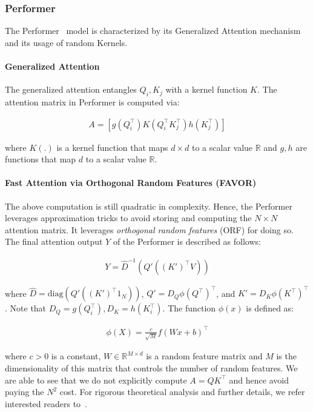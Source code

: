 \subsubsection{Performer}
The Performer~\citep{choromanski2020masked, choromanski2020rethinking} model is characterized by its Generalized Attention mechanism and its usage of random Kernels. 
\paragraph{Generalized Attention}  The generalized attention entangles $Q_i,K_j$ with a kernel function $K$. The attention matrix in Performer is computed via:

\begin{align}
A = [g(Q_i^\top)K(Q_i^\top K_j^\top) h(K_j^\top)]    
\end{align}

where $K(.)$ is a kernel function that maps $d \times d$ to a scalar value $\mathbb{R}$ and $g,h$ are functions that map $d$ to a scalar value $\mathbb{R}$. 
\paragraph{Fast Attention via Orthogonal Random Features (FAVOR)} The above computation is still quadratic in complexity. Hence, the Performer leverages approximation tricks to avoid storing and computing the $N \times N$ attention matrix. It leverages \textit{orthogonal random features} (ORF) for doing so. The final attention output $Y$ of the Performer is described as follows:

\begin{align}
Y = \hat{D}^{-1}(Q'((K')^\top V))
\end{align}

where $\hat{D}=\text{diag}(Q'((K')^\top1_N))$, $Q'=D_Q\phi(Q^\top)^\top$, and $K'=D_K\phi(K^\top)^\top$. Note that $D_Q=g(Q_i^\top),D_K=h(K_i^\top)$. The function $\phi(x)$ is defined as:

\begin{align}
\phi(X)= \frac{c}{\sqrt{M}}f(Wx +b)^\top
\end{align}

where $c > 0$ is a constant, $W \in \mathbb{R}^{M \times d}$ is a random feature matrix and $M$ is the dimensionality of this matrix that controls the number of random features. We are able to see that we do not explicitly compute $A=QK^\top$ and hence avoid paying the $N^2$ cost. For rigorous theoretical analysis and further details, we refer interested readers to~\citep{choromanski2020masked}.

